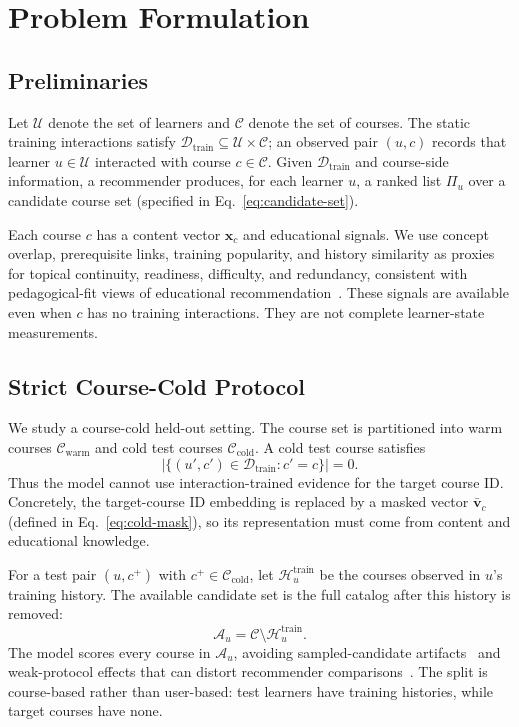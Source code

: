 \documentclass[letterpaper]{article}
\begin{document}
\section{Problem Formulation}

\subsection{Preliminaries}
Let \(\mathcal{U}\) denote the set of learners and \(\mathcal{C}\) denote the set of courses. The static training interactions satisfy \(\mathcal{D}_{\mathrm{train}}\subseteq\mathcal{U}\times\mathcal{C}\); an observed pair \((u,c)\) records that learner \(u\in\mathcal{U}\) interacted with course \(c\in\mathcal{C}\). Given \(\mathcal{D}_{\mathrm{train}}\) and course-side information, a recommender produces, for each learner \(u\), a ranked list \(\Pi_u\) over a candidate course set (specified in Eq.~\eqref{eq:candidate-set}).

Each course \(c\) has a content vector \(\mathbf{x}_c\) and educational signals. We use concept overlap, prerequisite links, training popularity, and history similarity as proxies for topical continuity, readiness, difficulty, and redundancy, consistent with pedagogical-fit views of educational recommendation~\cite{dasilva2023educationalrs,rahayu2023learningpath}. These signals are available even when \(c\) has no training interactions. They are not complete learner-state measurements.

\subsection{Strict Course-Cold Protocol}
We study a course-cold held-out setting. The course set is partitioned into warm courses \(\mathcal{C}_{\mathrm{warm}}\) and cold test courses \(\mathcal{C}_{\mathrm{cold}}\). A cold test course satisfies
\begin{equation}
|\{(u',c')\in \mathcal{D}_{\mathrm{train}}: c'=c\}|=0.
\end{equation}
Thus the model cannot use interaction-trained evidence for the target course ID. Concretely, the target-course ID embedding is replaced by a masked vector \(\bar{\mathbf{v}}_c\) (defined in Eq.~\eqref{eq:cold-mask}), so its representation must come from content and educational knowledge.

For a test pair \((u,c^+)\) with \(c^+\in\mathcal{C}_{\mathrm{cold}}\), let \(\mathcal{H}^{\mathrm{train}}_u\) be the courses observed in \(u\)'s training history. The available candidate set is the full catalog after this history is removed:
\begin{equation}
\mathcal{A}_u=\mathcal{C}\setminus \mathcal{H}^{\mathrm{train}}_u .
\label{eq:candidate-set}
\end{equation}
The model scores every course in \(\mathcal{A}_u\), avoiding sampled-candidate artifacts~\cite{krichene2020sampled,li2024itemsampling} and weak-protocol effects that can distort recommender comparisons~\cite{dacrema2019progress,hidasi2023flaws}. The split is course-based rather than user-based: test learners have training histories, while target courses have none.
\end{document}
